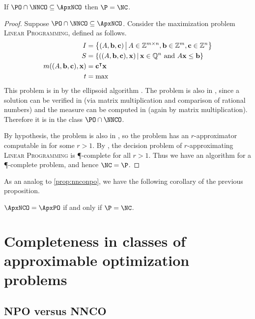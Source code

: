 \documentclass[]{article}
\let\originalleft\left
\let\originalright\right
\renewcommand{\left}{\mathopen{}\mathclose\bgroup\originalleft}
\renewcommand{\right}{\aftergroup\egroup\originalright}
\begin{document}
\begin{proposition}\label{prop:popapxnco}
  If $\PO \cap \NNCO \subseteq \ApxNCO$ then $\P = \NC$.
\end{proposition}
\begin{proof}
  Suppose $\PO \cap \NNCO \subseteq \ApxNCO$.
  Consider the maximization problem \textsc{Linear Programming}, defined as follows.
  \begin{align*}
    I & = \left\{(A, \mathbf{b}, \mathbf{c}) \, \middle| \, A \in \mathbb{Z}^{m \times n}, \mathbf{b} \in \mathbb{Z}^m, \mathbf{c} \in \mathbb{Z}^n \right\} \\
    S & = \left\{((A, \mathbf{b}, \mathbf{c}), \mathbf{x}) \, \middle| \, \mathbf{x} \in \mathbb{Q}^n \text{ and } A\mathbf{x} \leq \mathbf{b}\right\} \\
    m((A, \mathbf{b}, \mathbf{c}), \mathbf{x}) & = \mathbf{c}^\intercal\mathbf{x} \\
    t & = \max
  \end{align*}
  This problem is in \PO{} by the ellipsoid algorithm \cite{khachian79}.
  The problem is also in \NNCO{}, since a solution can be verified in \NC{} (via matrix multiplication and comparison of rational numbers) and the measure can be computed in \NC{} (again by matrix multiplication).
  Therefore it is in the class $\PO \cap \NNCO$.

  By hypothesis, the problem is also in \ApxNCO{}, so the problem has an $r$-approximator computable in \NC{} for some $r > 1$.
  By \cite[Theorem~8.2.7]{dsst97}, the decision problem of $r$-approximating \textsc{Linear Programming} is \P-complete for all $r > 1$.
  Thus we have an \NC{} algorithm for a \P-complete problem, and hence $\NC = \P$.
\end{proof}

As an analog to \autoref{prop:nnconpo}, we have the following corollary of the previous proposition.

\begin{corollary}
  $\ApxNCO = \ApxPO$ if and only if $\P = \NC$.
\end{corollary}

\section{Completeness in classes of approximable optimization problems}

\subsection{NPO versus NNCO}
\end{document}
